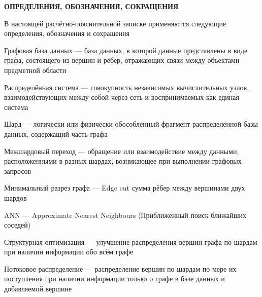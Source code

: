 \begin{center}
    \textbf{ОПРЕДЕЛЕНИЯ, ОБОЗНАЧЕНИЯ, СОКРАЩЕНИЯ}
        \vspace{-1em}
\end{center}

В настоящей расчётно-пояснительной записке применяются следующие определения, обозначения и сохращения

{\setlength{\parindent}{0pt}
Графовая база данных --- база данных, в которой данные представлены в виде графа, состоящего из вершин и рёбер, отражающих связи между объектами предметной области

Распределённая система --- совокупность независимых вычислительных узлов, взаимодействующих между собой через сеть и воспринимаемых как единая система

Шард --- логически или физически обособленный фрагмент распределённой базы данных, содержащий часть графа

Межшардовый переход --- обращение или взаимодействие между данными, расположенными в разных шардах, возникающее при выполнении графовых запросов

Минимальный разрез графа --- Edge cut сумма рёбер между вершинами двух шардов

ANN --- Approximate Nearest Neighbours (Приближенный поиск ближайших соседей)

Структурная оптимизация --- улучшение распределения вершин графа по шардам при наличии информации обо всём графе

Потоковое распределение --- распределение вершин по шардам по мере их поступления при наличии информации только о графе в базе данных и добавляемой вершине
}